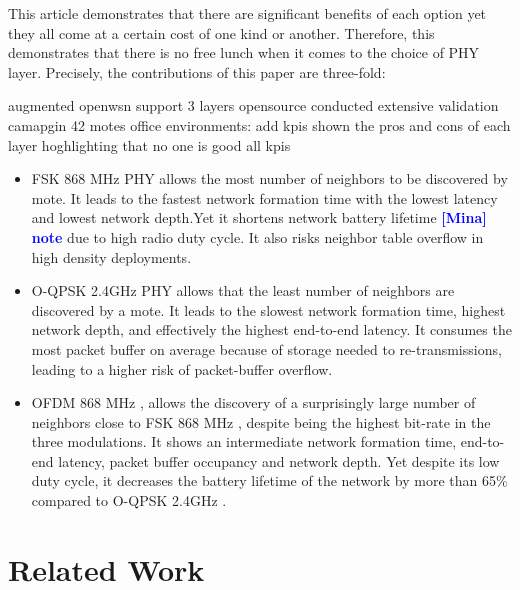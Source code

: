 \documentclass[journal]{IEEEtran}
\newcommand{\fsk}          {FSK 868 MHz }
\newcommand{\oqpsk}        {O-QPSK 2.4GHz }
\newcommand{\ofdm}         {OFDM 868 MHz }
\newcommand{\mina}[1]      {\textbf{\textcolor{blue}{[Mina] #1}}}
\begin{document}
 
This article demonstrates that there are significant benefits of each option yet they all come at a certain cost of one kind or another.
Therefore, this demonstrates that there is no free lunch when it comes to the choice of PHY layer.
Precisely, the contributions of this paper are three-fold:

% 
augmented openwsn support 3 layers opensource
conducted extensive validation camapgin 42 motes office environments: add kpis
shown the pros and cons of each layer hoghlighting that no one is good all  kpis

\begin{itemize}
   \item \fsk PHY allows the most number of neighbors to be discovered by mote. 
    It leads to the fastest network formation time with the lowest latency and lowest network depth.Yet it shortens network battery lifetime \mina{note} due to high radio duty cycle. 
    It also risks neighbor table overflow in high density deployments.
   
   \item \oqpsk PHY allows that the least number of neighbors are discovered by a mote. 
   It leads to the slowest network formation time, highest network depth, and effectively the highest end-to-end latency. 
   It consumes the most packet buffer on average because of storage needed to re-transmissions, leading to a higher risk of packet-buffer overflow. 
   
   \item \ofdm, allows the discovery of a surprisingly large number of neighbors close to \fsk, despite being the highest bit-rate in the three modulations. 
   It shows an intermediate network formation time, end-to-end latency, packet buffer occupancy and network depth.
   Yet despite its low duty cycle, it decreases the battery lifetime of the network by more than 65\% compared to \oqpsk.
\end{itemize}
  


\section{Related Work}
\label{sec:related_work}

\end{document}
